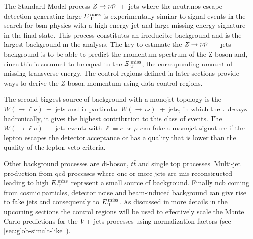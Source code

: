 The Standard Model process $Z \rightarrow \nu \bar{\nu}$~+~jets where the neutrinos escape detection
generating large $E_\mathrm{\, T}^\mathrm{\, miss}$ is experimentally similar to signal events in the search
for \gls{bsm} physics with a high energy jet and large missing energy signature
in the final state. This process constitutes an irreducible background and is
the largest background in the analysis. The key to estimate the $Z \rightarrow \nu \bar{\nu}$~+~jets
background is to be able to predict the momentum spectrum of the Z boson and,
since this is assumed to be equal to the $E_\mathrm{\, T}^\mathrm{\, miss}$, the corresponding amount of
missing transverse energy. The control regions defined in later sections provide
ways to derive the $Z$ boson momentum using data control regions.

The second biggest source of background with a monojet topology is the
$W (\rightarrow \ell \nu)$~+~jets and in particular
$W (\rightarrow \tau \nu)$~+~jets, in which the $\tau$ decays hadronically, it
gives the highest contribution to this class of events. The
$W (\rightarrow \ell \nu)$~+~jets events with $\ell = e$ or $\mu$ can fake a
monojet signature if the lepton escapes the detector acceptance or has a quality
that is lower than the quality of the lepton veto criteria.

Other background processes are di-boson, $t \bar{t}$ and single top
processes. Multi-jet production from \gls{qcd} processes where one or more jets
are mis-reconstructed leading to high $E_\mathrm{\, T}^\mathrm{\, miss}$ represent a small source of
background. Finally \gls{ncb} coming from cosmic particles, detector noise and
beam-induced background can give rise to fake jets and consequently to
$E_\mathrm{\, T}^\mathrm{\, miss}$. As discussed in more details in the upcoming sections the control
regions will be used to effectively scale the Monte Carlo predictions for the $V$
+ jets processes using normalization factors (see \cref{sec:glob-simult-likel}).
